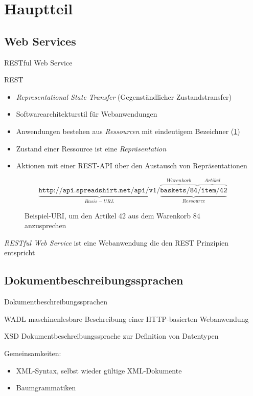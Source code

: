 \section{Hauptteil}

\subsection{Web Services}
\begin{frame}{RESTful Web Service}
    \begin{block}{REST}
        \begin{itemize}
            \item \emph{Representational State Transfer} (Gegenständlicher Zustandstransfer)
            \item Softwarearchitekturstil für Webanwendungen
            \item Anwendungen bestehen aus \emph{Ressourcen} mit eindeutigem Bezeichner (\cref{restURI}) %
            \item Zustand einer Ressource ist eine \emph{Repräsentation}
            \item Aktionen mit einer REST-API über den Austausch von Repräsentationen
        \end{itemize}
    \end{block}
\end{frame}

\begin{frame}
    \begin{figure}
        \centering
        \[
            \underbrace{\texttt{http://api.spreadshirt.net/api/v1/}}_{Basis-URL}\underbrace{\overbrace{\texttt{baskets/84}}^{Warenkorb}\overbrace{\texttt{/item/42}}^{Artikel}}_{Ressource}
        \]
        \caption{Beispiel-URI, um den Artikel 42 aus dem Warenkorb 84 anzusprechen}
        \label{restURI}
    \end{figure}
    \emph{RESTful Web Service} ist eine Webanwendung die den REST Prinzipien entspricht
\end{frame}

\subsection{Dokumentbeschreibungssprachen}
\begin{frame}[squeeze]{Dokumentbeschreibungssprachen}
    \begin{block}{WADL}
        maschinenlesbare Beschreibung einer HTTP-basierten Webanwendung
    \end{block}
    \begin{block}{XSD}
        Dokumentbeschreibungssprache zur Definition von Datentypen
    \end{block}
    Gemeinsamkeiten:
    \begin{itemize}
        \item XML-Syntax, selbst wieder gültige XML-Dokumente
        \item Baumgrammatiken
    \end{itemize}
\end{frame}

